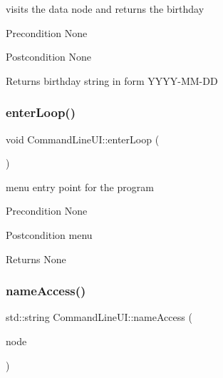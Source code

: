visits the data node and returns the birthday \begin{DoxyPrecond}{Precondition}
None 
\end{DoxyPrecond}
\begin{DoxyPostcond}{Postcondition}
None 
\end{DoxyPostcond}
\begin{DoxyReturn}{Returns}
birthday string in form Y\+Y\+Y\+Y-\/\+M\+M-\/\+DD 
\end{DoxyReturn}
\mbox{\label{class_command_line_u_i_ac72a09121b78bdf1ab1f457795fcf370}} 
\subsubsection{\texorpdfstring{enter\+Loop()}{enterLoop()}}
{\footnotesize\ttfamily void Command\+Line\+U\+I\+::enter\+Loop (\begin{DoxyParamCaption}{ }\end{DoxyParamCaption})\hspace{0.3cm}{\ttfamily [static]}}

menu entry point for the program \begin{DoxyPrecond}{Precondition}
None 
\end{DoxyPrecond}
\begin{DoxyPostcond}{Postcondition}
menu 
\end{DoxyPostcond}
\begin{DoxyReturn}{Returns}
None 
\end{DoxyReturn}
\mbox{\label{class_command_line_u_i_afaceee7574a4ed29efc107e2ab2c9087}} 
\subsubsection{\texorpdfstring{name\+Access()}{nameAccess()}}
{\footnotesize\ttfamily std\+::string Command\+Line\+U\+I\+::name\+Access (\begin{DoxyParamCaption}\item[{\hyperlink{class_node_main}{Node\+Main} $\ast$}]{node }\end{DoxyParamCaption})\hspace{0.3cm}{\ttfamily [static]}}

